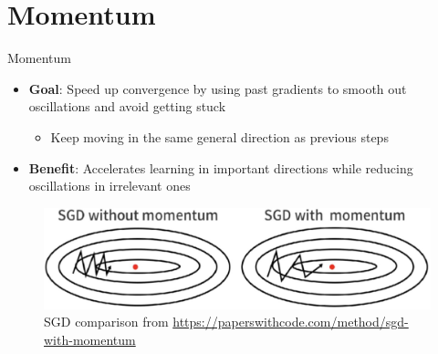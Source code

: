 \documentclass[serif, aspectratio=169]{beamer}
\begin{document}
\section{Momentum}
\begin{frame}{Momentum}
    \begin{minipage}{0.5\textwidth}
        \begin{itemize}
            \item \textbf{Goal}: Speed up convergence by using past gradients to smooth out oscillations and avoid getting stuck
            \begin{itemize}
                \item Keep moving in the same general direction as previous steps
            \end{itemize}
            \item \textbf{Benefit}: Accelerates learning in important directions while reducing oscillations in irrelevant ones
        \end{itemize}
    \end{minipage}%
    \begin{minipage}{0.5\linewidth}
    \begin{figure}[h]
        \centering
        \includegraphics[height=.25\textheight]{pic/momentum_paperswithcode.jpg}
        \caption{\footnotesize SGD comparison from \url{https://paperswithcode.com/method/sgd-with-momentum}}
    \end{figure}
    \end{minipage}
\end{frame}
\end{document}
